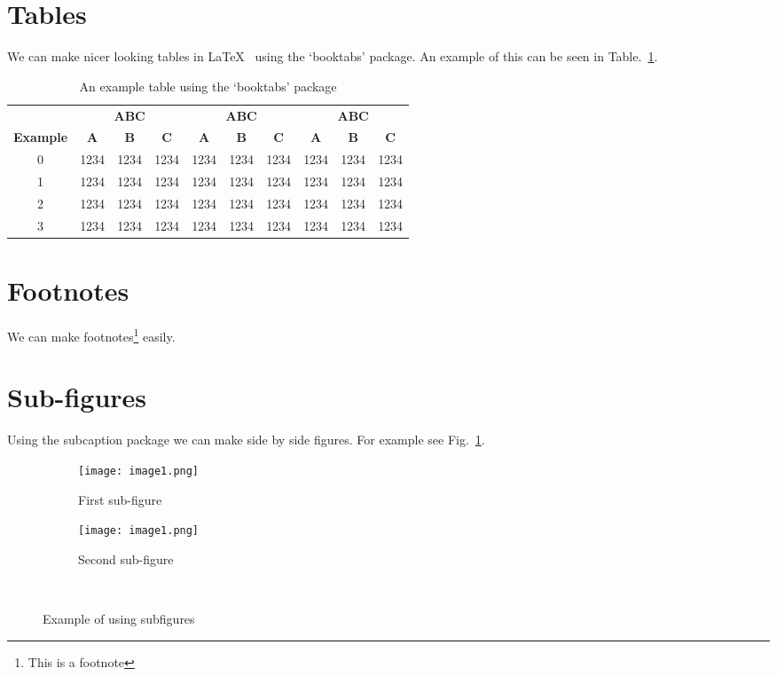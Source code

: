 \section{Tables}
We can make nicer looking tables in \LaTeX~ using the `booktabs' package.
An example of this can be seen in Table.~\ref{fig:exampletable}.
\begin{table}[h]
\centering
\caption{An example table using the `booktabs' package}
\label{fig:exampletable}
\begin{tabular}{cccccccccc}
\toprule
& \multicolumn{3}{c}{\textbf{ABC}} & \multicolumn{3}{c}{\textbf{ABC}} & \multicolumn{3}{c}{\textbf{ABC}} \\
\cmidrule(lr){2-4}\cmidrule(lr){5-7}\cmidrule(lr){8-10}
\textbf{Example}      & \textbf{A}       & \textbf{B}       & \textbf{C}      & \textbf{A}           & \textbf{B}           & \textbf{C}          & \textbf{A}           & \textbf{B}           & \textbf{C}          \\
\cmidrule(lr){1-1}\cmidrule(lr){2-4}\cmidrule(lr){5-7}\cmidrule(lr){8-10}
0         & 1234      & 1234     & 1234     & 1234          & 1234         & 1234         & 1234        & 1234         & 1234         \\
1         & 1234      & 1234     & 1234     & 1234          & 1234         & 1234         & 1234          & 1234         & 1234         \\
2         & 1234      & 1234     & 1234     & 1234          & 1234         & 1234         & 1234        & 1234         & 1234        \\
3         & 1234      & 1234     & 1234     & 1234          & 1234         & 1234         & 1234        & 1234         & 1234         \\ \bottomrule
\end{tabular}
\end{table}

\section{Footnotes}
We can make footnotes\footnote{This is a footnote} easily.

\section{Sub-figures}
Using the subcaption package we can make side by side figures.
For example see Fig.~\ref{fig:subfigureexample}.

\begin{figure}[h]
\centering
    \begin{subfigure}[t]{0.45\textwidth}
    \centering
        \texttt{[image: image1.png]}
    \caption{First sub-figure}
    \end{subfigure}
\hfill
    \begin{subfigure}[t]{0.45\textwidth}\centering
    \centering
        \texttt{[image: image1.png]}
    \caption{Second sub-figure}
    \end{subfigure}
~
\caption{Example of using subfigures}
\label{fig:subfigureexample}
\end{figure}
